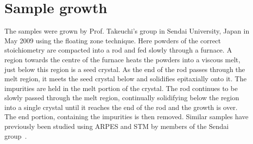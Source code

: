 
\section{Sample growth}

The samples were grown by Prof. Takeuchi's group in Sendai University, Japan in May 2009 using the floating zone technique. Here powders of the correct stoichiometry are compacted into a rod and fed slowly through a furnace. A region towards the centre of the furnace heats the powders into a viscous melt, just below this region is a seed crystal. As the end of the rod passes through the melt region, it meets the seed crystal below and solidifies epitaxially onto it. The impurities are held in the melt portion of the crystal. The rod continues to be slowly passed through the melt region, continually solidifying below the region into a single crystal until it reaches the end of the rod and the growth is over. The end portion, containing the impurities is then removed. Similar samples have previously been studied using \ac{ARPES} and \ac{STM} by members of the Sendai group~\cite{Wise2009, Wise2008, Kondo2007, Kondo2005, Kondo2010, Kondo2009, Kondo2006, Kondo2007}.

